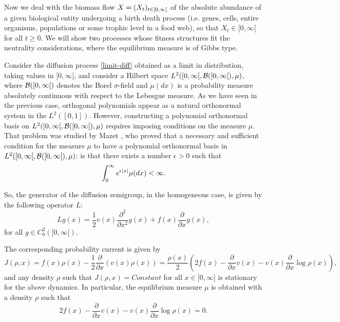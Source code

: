 \documentclass[12pt]{article}
\begin{document}
Now we deal with the  biomass flow $X=({X}_{t})_{t\in [0,\infty[}$ of the absolute abundance of a given biological entity undergoing a birth death process (i.e. genes, cells,  entire organisms, populations or some  trophic level in a food web), so that $X_t\in [0,\infty[$ for all $t\geq 0$. We will show two processes whose fitness structures fit the neutrality considerations, where the equilibrium measure is of Gibbs type. 

Consider the diffusion process \eqref{limit-diff} obtained as a limit in distribution, taking values in $[0,\infty[$, and consider a Hilbert space $L^2([0,\infty[,\mathcal{B}([0,\infty[),\mu)$, where $\mathcal{B}([0,\infty[)$ denotes the Borel $\sigma$-field and $\mu(dx)$ is a probability measure absolutely continuous with respect to the Lebesgue measure. As we have seen in the previous case, orthogonal polynomials appear as a natural orthonormal system in the $L^2([0,1])$. However, constructing a polynomial orthonormal basis on $L^2([0,\infty[,\mathcal{B}([0,\infty[),\mu)$ requires imposing conditions on the measure $\mu$. That problem was studied by Mazet \cite{Mazet}, who proved that a necessary and sufficient condition for the measure $\mu$ to have a polynomial orthonormal basis in $L^2([0,\infty[,\mathcal{B}([0,\infty[),\mu)$: is that there exists a number $\epsilon>0$ such that
\begin{equation}
    \int_0^\infty e^{\epsilon \left\vert x\right\vert}\mu(dx)<\infty.
\end{equation}


So, the generator of the diffusion semigroup, in the homogeneous case, is given by the following operator $L$:
\begin{equation}\label{Generator-2}
    Lg(x)=\frac{1}{2}v(x)\frac{\partial^2}{\partial x^2}g(x)+f(x)\frac{\partial}{\partial x}g(x),
\end{equation}
for all $g\in C_0^2([0,\infty[)$.




The corresponding probability current is given by
\begin{equation}\label{current-prob-2}
    J(\rho,x)=f(x)\rho (x)-\frac{1}{2}\frac{\partial}{\partial x}\left( v(x)\rho (x)\right)=\frac{\rho(x)}{2}\left(2f(x)-\frac{\partial}{\partial x}v(x)-v(x)\frac{\partial}{\partial x}\log \rho (x)\right),
\end{equation}
and any density $\rho$ such that $J(\rho,x)=Constant$ for all $x\in [0,\infty[$ is stationary for the above dynamics. In particular, the equilibrium measure $\mu$ is obtained with a density $\rho$ such that
\begin{equation}\label{eq:current-eq}
 2f(x)-\frac{\partial}{\partial x}v(x)-v(x)\frac{\partial}{\partial x}\log \rho (x)=0.   
\end{equation}
\end{document}
